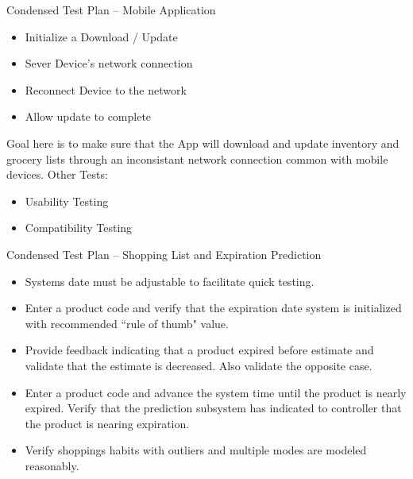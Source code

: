 \documentclass[t]{beamer}
\begin{document}
\begin{frame}{Condensed Test Plan -- Mobile Application}
    \begin{itemize}
        \item Initialize a Download / Update
        \item Sever Device's network connection
        \item Reconnect Device to the network 
        \item Allow update to complete
    \end{itemize}
    Goal here is to make sure that the App will download and update inventory and grocery 
    lists through an inconsistant network connection common with mobile devices.
    \newline \quad \newline
    Other Tests:
    \begin{itemize}
        \item Usability Testing
        \item Compatibility Testing
    \end{itemize}
\end{frame}

\begin{frame}{Condensed Test Plan -- Shopping List and Expiration Prediction}
\begin{itemize}
\item Systems date must be adjustable to facilitate quick testing.
\item Enter a product code and verify that the expiration date system is initialized with recommended ``rule of thumb" value.
\item Provide feedback indicating that a product expired before estimate and validate that the estimate is decreased. Also validate the opposite case.
\item Enter a product code and advance the system time until the product is nearly expired. Verify that the prediction subsystem has indicated to controller that the product is nearing expiration.
\item Verify shoppings habits with outliers and multiple modes are modeled reasonably.
\end{itemize}
\end{frame}
\end{document}
